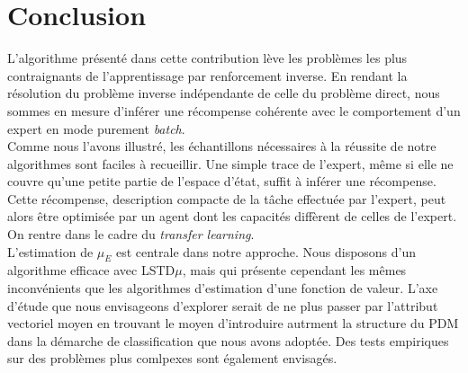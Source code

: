 \documentclass{article}
\begin{document}
\section{Conclusion}

L'algorithme présenté dans cette contribution lève les problèmes les plus contraignants de l'apprentissage par renforcement inverse. En rendant la résolution du problème inverse indépendante
de celle du problème direct, nous sommes en mesure d'inférer une récompense cohérente avec le comportement d'un expert en mode purement \emph{batch}.\\

Comme nous l'avons illustré, les échantillons nécessaires à la réussite de notre algorithmes sont faciles à recueillir.
Une simple trace de l'expert, même si elle ne couvre qu'une petite partie de l'espace d'état, suffit à inférer une récompense.
Cette récompense, description compacte de la tâche effectuée par l'expert, peut alors être optimisée par un agent dont les capacités diffèrent de celles de l'expert.
On rentre dans le cadre du \emph{transfer learning}.\\

L'estimation de $\mu_E$ est centrale dans notre approche. Nous disposons d'un algorithme efficace avec LSTD$\mu$, mais qui présente cependant les mêmes inconvénients
que les algorithmes d'estimation d'une fonction de valeur. L'axe d'étude que nous envisageons d'explorer serait de ne plus passer par l'attribut vectoriel moyen en trouvant le moyen
d'introduire autrment la structure du PDM dans la démarche de classification que nous avons adoptée. Des tests empiriques sur des problèmes plus comlpexes sont également envisagés.
%
%


\end{document}
